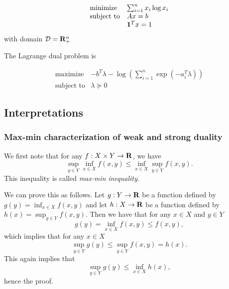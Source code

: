 \begin{equation}
\begin{array}{ll}
\mbox{minimize} & \sum_{i=1}^n x_i \log x_i
\\
\mbox{subject to} & Ax = b
\\
& \mathbf 1^T x = 1
\end{array}
\end{equation}
with domain $\mathcal{D} = \mathbf{R}^n_+$

The Lagrange dual problem is

\begin{equation}
\begin{array}{ll}
\mbox{maximize} & - b^T \lambda - \log \left( \sum_{i=1}^n \exp(-a_i^T \lambda) \right)
\\
\mbox{subject to} & \lambda  \succeq 0
\end{array}
\end{equation}



\subsection{Interpretations}

\subsubsection{Max-min characterization of weak and strong duality}

We first note that for any $f: X \times Y \to \mathbf{R}$, we have
\begin{equation}
\sup_{y\in Y} \inf_{x\in X} f(x,y)
\leq \inf_{x\in X} \sup_{y\in Y} f(x,y).
\end{equation}
This inequality is called \emph{max-min inequality}.

We can prove this as follows.
Let $g:Y\to\mathbf{R}$ be a function defined by $g(y) = \inf_{x \in X} f(x,y)$ and
let $h:X\to\mathbf{R}$ be a function defined by $h(x) = \sup_{y \in Y} f(x,y)$.
Then we have that for any $x\in X$ and $y\in Y$
\begin{equation}
g(y) = \inf_{x\in X} f(x,y) \leq f(x,y),
\end{equation}
which implies that for any $x\in X$
\begin{equation}
\sup_{y\in Y} g(y) \leq \sup_{y\in Y} f(x,y) = h(x).
\end{equation}
This again implies that
\begin{equation}
\sup_{y\in Y} g(y) \leq \inf_{x\in X} h(x),
\end{equation}
hence the proof.




